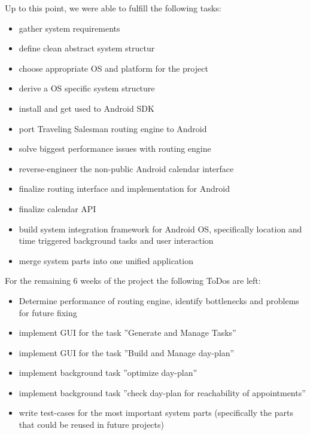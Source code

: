 Up to this point, we were able to fulfill the following tasks:
\begin{itemize}
\item gather system requirements
\item define clean abstract system structur
\item choose appropriate OS and platform for the project
\item derive a OS specific system structure
\item install and get used to Android SDK
\item port Traveling Salesman routing engine to Android
\item solve biggest performance issues with routing engine
\item reverse-engineer the non-public Android calendar interface
\item finalize routing interface and implementation for Android
\item finalize calendar API
\item build system integration framework for Android OS, specifically  location and time triggered background tasks and user interaction
\item merge system parts into one unified application
\end{itemize}

 For the remaining 6 weeks of the project the following ToDos are left:
 \begin{itemize}
\item Determine performance of routing engine, identify bottlenecks and problems for future fixing
\item implement GUI for the task ''Generate and Manage Tasks''
\item implement GUI for the task ''Build and Manage day-plan''
\item implement background task ''optimize day-plan''
\item implement background task ''check day-plan for reachability of appointments''
\item write test-cases for the most important system parts (specifically the parts that could be reused in future projects)
\end{itemize}
